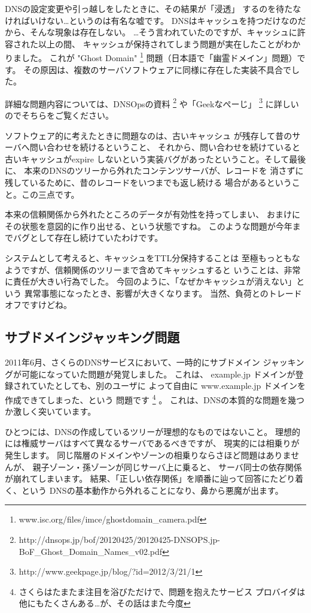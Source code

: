 DNSの設定変更や引っ越しをしたときに、その結果が「浸透」
するのを待たなければいけない…というのは有名な嘘です。
DNSはキャッシュを持つだけなのだから、そんな現象は存在しない。
…そう言われていたのですが、キャッシュに許容された以上の間、
キャッシュが保持されてしまう問題が実在したことがわかりました。
これが "Ghost Domain" 
\footnote{www.isc.org/files/imce/ghostdomain\_camera.pdf}
問題（日本語で「幽霊ドメイン」問題）です。 
その原因は、複数のサーバソフトウェアに同様に存在した実装不具合でした。

詳細な問題内容については、DNSOpsの資料 
\footnote{http://dnsops.jp/bof/20120425/20120425-DNSOPS.jp-BoF\_Ghost\_Domain\_Names\_v02.pdf}
や「Geekなぺーじ」
\footnote{http://www.geekpage.jp/blog/?id=2012/3/21/1} に詳しい
のでそちらをご覧ください。

ソフトウェア的に考えたときに問題なのは、古いキャッシュ
が残存して昔のサーバへ問い合わせを続けるということ、
それから、問い合わせを続けていると古いキャッシュがexpire
しないという実装バグがあったということ。そして最後に、
本来のDNSのツリーから外れたコンテンツサーバが、レコードを
消さずに残しているために、昔のレコードをいつまでも返し続ける
場合があるということ。この三点です。

本来の信頼関係から外れたところのデータが有効性を持ってしまい、
おまけにその状態を意図的に作り出せる、という状態ですね。
このような問題が今年までバグとして存在し続けていたわけです。

システムとして考えると、キャッシュをTTL分保持することは
至極もっともなようですが、信頼関係のツリーまで含めてキャッシュすると
いうことは、非常に責任が大きい行為でした。
今回のように、「なぜかキャッシュが消えない」という
異常事態になったとき、影響が大きくなります。
当然、負荷とのトレードオフですけどね。


\subsection{ サブドメインジャッキング問題 }
2011年6月、さくらのDNSサービスにおいて、一時的にサブドメイン
ジャッキングが可能になっていた問題が発覚しました。
これは、 example.jp ドメインが登録されていたとしても、別のユーザに
よって自由に www.example.jp ドメインを作成できてしまった、という
問題です
\footnote{さくらはたまたま注目を浴びただけで、問題を抱えたサービス
プロバイダは他にもたくさんある…が、その話はまた今度}
。 これは、DNSの本質的な問題を幾つか激しく突いています。

ひとつには、DNSの作成しているツリーが理想的なものではないこと。
理想的には権威サーバはすべて異なるサーバであるべきですが、
現実的には相乗りが発生します。
同じ階層のドメインやゾーンの相乗りならさほど問題はありませんが、
親子ゾーン・孫ゾーンが同じサーバ上に乗ると、
サーバ同士の依存関係が崩れてしまいます。
結果、「正しい依存関係」を順番に辿って回答にたどり着く、という
DNSの基本動作から外れることになり、鼻から悪魔が出ます。


